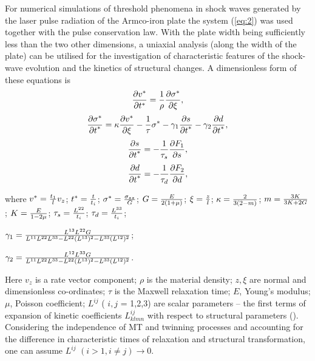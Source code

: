 \documentclass[sw,bibself]{svjour}
\begin{document}
For numerical simulations of threshold phenomena in shock waves
generated by the laser pulse radiation of the Armco-iron plate the
system (\ref{eq:2}) was used together with the pulse conservation law.
With the plate width being sufficiently less than the two other
dimensions, a uniaxial analysis (along the width of the plate) can be
utilised for the investigation of characteristic features of the
shock-wave evolution and the kinetics of structural changes. A
dimensionless form of these equations is
\[
{ {\partial v^{*}} \over {\partial t^{*}} } = {1 \over {\rho}}
{ {\partial \sigma^{*}} \over {\partial \xi} },\]
\[
{ {\partial \sigma^{*}} \over {\partial t}^{*} } =
\kappa { {\partial v ^{*}} \over {\partial \xi} } -
{1 \over {\tau}} {\sigma}^{*} -
{\gamma_{1}} { {\partial s} \over {\partial t}^{*} } -
{\gamma _{2}} { {\partial d} \over {\partial t}^{*} },\]
\[
{ {\partial s} \over {\partial t}^{*} } =
- {1 \over {\tau}_{s}} { {\partial F _{1}} \over {\partial s}
},\]
\begin{equation}
{ {\partial d} \over {\partial t}^{*} } =
- {1 \over {\tau}_{d}} { {\partial F _{2}} \over {\partial d} },
\end{equation}

\noindent
where $v^{*} = {{t_{1}} \over l} v_{z}$;
$t^{*} = {t \over t_{i}}$;
$\sigma^{*} = {{\sigma_{zz}} \over G}$;
$G = {E \over {2(1+{\mu})}}$;
${\xi} = {z \over l}$;
${\kappa} = { {2} \over {3(2-m)}}$;
$m = { {3K} \over {3K+2G}}$;
$K = {E \over {1-2{\mu}}}$;
${\tau}_{s} = {{L^{22}} \over {t_{i}}}$;
${\tau}_{d} = {{L^{33}} \over {t_{i}}}$;

\noindent
${\gamma}_{1} = {{L^{13} L^{22} G} \over
{L^{11} L^{22} L^{33} - L^{22} {(L^{13})^{2}} - L^{33} {(L^{12})^{2}}}}$;

\noindent
${\gamma}_{2} = {{L^{12} L^{33} G} \over
{L^{11} L^{22} L^{33} - L^{22} {(L^{13})^{2}} - L^{33} {(L^{12})^{2}} }}$.

\noindent
Here $v_{z}$ is a rate vector component; ${\rho}$ is the material
density;
$z, {\xi}$ are normal and dimensionless co-ordinates;
${\tau}$ is the Maxwell relaxation time; $E$, Young's modulus;
${\mu}$, Poisson coefficient; $L^{ij}$  ( $i,j$ = 1,2,3)
are scalar parameters -- the first terms of expansion of kinetic
coefficients $L_{klmn}^{ij}$
with respect to structural parameters (\cite{ref3}).
Considering the independence of MT and twinning processes
and accounting for the difference in characteristic times of relaxation
and structural transformation, one can assume $L^{ij}$
$(i >1, i {\not=} j) {\rightarrow} 0$.
\end{document}

